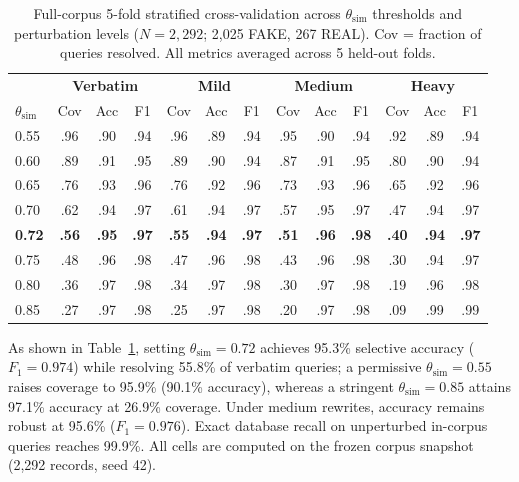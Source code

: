 \documentclass[twoside]{llncs}
\begin{document}
\begin{table}[!htbp]
\caption{Full-corpus 5-fold stratified cross-validation across $\theta_{\text{sim}}$ thresholds and perturbation levels ($N=2{,}292$; 2,025 FAKE, 267 REAL). Cov = fraction of queries resolved. All metrics averaged across 5 held-out folds.}
\label{tab:accuracy}
\centering
\small
\begin{tabular}{l|ccc|ccc|ccc|ccc}
\toprule
& \multicolumn{3}{c|}{\textbf{Verbatim}} & \multicolumn{3}{c|}{\textbf{Mild}} & \multicolumn{3}{c|}{\textbf{Medium}} & \multicolumn{3}{c}{\textbf{Heavy}} \\
$\theta_{\text{sim}}$ & Cov & Acc & F1 & Cov & Acc & F1 & Cov & Acc & F1 & Cov & Acc & F1 \\
\midrule
0.55 & .96 & .90 & .94 & .96 & .89 & .94 & .95 & .90 & .94 & .92 & .89 & .94 \\
0.60 & .89 & .91 & .95 & .89 & .90 & .94 & .87 & .91 & .95 & .80 & .90 & .94 \\
0.65 & .76 & .93 & .96 & .76 & .92 & .96 & .73 & .93 & .96 & .65 & .92 & .96 \\
0.70 & .62 & .94 & .97 & .61 & .94 & .97 & .57 & .95 & .97 & .47 & .94 & .97 \\
\textbf{0.72} & \textbf{.56} & \textbf{.95} & \textbf{.97} & \textbf{.55} & \textbf{.94} & \textbf{.97} & \textbf{.51} & \textbf{.96} & \textbf{.98} & \textbf{.40} & \textbf{.94} & \textbf{.97} \\
0.75 & .48 & .96 & .98 & .47 & .96 & .98 & .43 & .96 & .98 & .30 & .94 & .97 \\
0.80 & .36 & .97 & .98 & .34 & .97 & .98 & .30 & .97 & .98 & .19 & .96 & .98 \\
0.85 & .27 & .97 & .98 & .25 & .97 & .98 & .20 & .97 & .98 & .09 & .99 & .99 \\
\bottomrule
\end{tabular}
\end{table}

As shown in Table~\ref{tab:accuracy}, setting $\theta_{\text{sim}} = 0.72$ achieves 95.3\% selective accuracy ($F_1 = 0.974$) while resolving 55.8\% of verbatim queries; a permissive $\theta_{\text{sim}} = 0.55$ raises coverage to 95.9\% (90.1\% accuracy), whereas a stringent $\theta_{\text{sim}} = 0.85$ attains 97.1\% accuracy at 26.9\% coverage. Under medium rewrites, accuracy remains robust at 95.6\% ($F_1 = 0.976$). Exact database recall on unperturbed in-corpus queries reaches 99.9\%. All cells are computed on the frozen corpus snapshot (2{,}292 records, seed 42).
\end{document}
